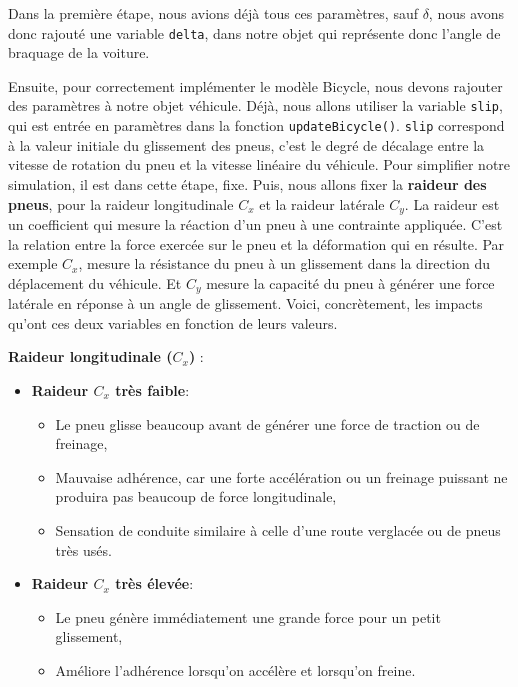 Dans la première étape, nous avions déjà tous ces paramètres, sauf $\delta$, nous avons donc rajouté une variable \texttt{delta}, dans notre objet qui représente donc l'angle de braquage de la voiture.
%



Ensuite, pour correctement implémenter le modèle Bicycle, nous devons rajouter des paramètres à notre objet véhicule.
Déjà, nous allons utiliser la variable \texttt{slip}, qui est entrée en paramètres dans la fonction \texttt{updateBicycle()}. \texttt{slip} correspond à la valeur initiale du glissement des pneus, c'est le degré de décalage entre la vitesse de rotation du pneu et la vitesse linéaire du véhicule.
Pour simplifier notre simulation, il est dans cette étape, fixe.
Puis, nous allons fixer la \textbf{raideur des pneus}, pour la raideur longitudinale $C_x$ et la raideur latérale $C_y$.
La raideur est un coefficient qui mesure la réaction d'un pneu à une contrainte appliquée.
C'est la relation entre la force exercée sur le pneu et la déformation qui en résulte.
Par exemple $C_x$, mesure la résistance du pneu à un glissement dans la direction du déplacement du véhicule.
Et $C_y$ mesure la capacité du pneu à générer une force latérale en réponse à un angle de glissement.
Voici, concrètement, les impacts qu'ont ces deux variables en fonction de leurs valeurs.

\textbf{Raideur longitudinale ($C_x$) }:
\begin{itemize}
    \item \textbf{Raideur $C_x$ très faible}:
    \begin{itemize}[label=$\star$]
        \item Le pneu glisse beaucoup avant de générer une force de traction ou de freinage,
        \item Mauvaise adhérence, car une forte accélération ou un freinage puissant ne produira pas beaucoup de force longitudinale,
        \item Sensation de conduite similaire à celle d’une route verglacée ou de pneus très usés.
    \end{itemize}

    \item \textbf{Raideur $C_x$ très élevée}:
    \begin{itemize}[label=$\star$]
        \item Le pneu génère immédiatement une grande force pour un petit glissement,
        \item Améliore l’adhérence lorsqu'on accélère et lorsqu'on freine.
    \end{itemize}
\end{itemize}

